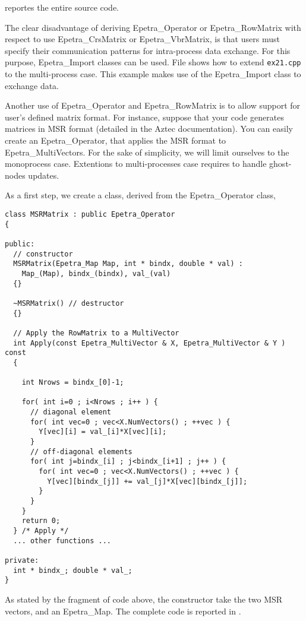  reportes the entire source code.

\begin{remark}
  The clear disadvantage of deriving Epetra\_Operator or
  Epetra\_RowMatrix with respect to use Epetra\_CrsMatrix or
  Epetra\_VbrMatrix, is that users must specify their communication
  patterns for intra-process data exchange. For this purpose,
  Epetra\_Import classes can be used.  File 
  shows how to extend \verb!ex21.cpp! to the multi-process case. This
  example makes use of the Epetra\_Import class to exchange data.
\end{remark}


Another use of  Epetra\_Operator and Epetra\_RowMatrix is to allow
support for user's defined matrix format. For instance, suppose that
your code generates matrices in MSR format (detailed in the Aztec
documentation). You can easily create an Epetra\_Operator, that applies
the MSR format to Epetra\_MultiVectors. For the sake of simplicity, we
will limit ourselves to the monoprocess case. Extentions to
multi-processes case requires to handle ghost-nodes updates.

As a first step, we create a class, derived from the Epetra\_Operator
class,
\begin{verbatim}
class MSRMatrix : public Epetra_Operator 
{

public:
  // constructor
  MSRMatrix(Epetra_Map Map, int * bindx, double * val) :
    Map_(Map), bindx_(bindx), val_(val) 
  {}

  ~MSRMatrix() // destructor
  {}

  // Apply the RowMatrix to a MultiVector
  int Apply(const Epetra_MultiVector & X, Epetra_MultiVector & Y ) const 
  {

    int Nrows = bindx_[0]-1;
    
    for( int i=0 ; i<Nrows ; i++ ) {
      // diagonal element
      for( int vec=0 ; vec<X.NumVectors() ; ++vec ) {
        Y[vec][i] = val_[i]*X[vec][i];
      }
      // off-diagonal elements
      for( int j=bindx_[i] ; j<bindx_[i+1] ; j++ ) {
        for( int vec=0 ; vec<X.NumVectors() ; ++vec ) {
          Y[vec][bindx_[j]] += val_[j]*X[vec][bindx_[j]];
        }
      }
    }
    return 0;
  } /* Apply */
  ... other functions ...

private:
  int * bindx_; double * val_;
}
\end{verbatim}
As stated by the fragment of code above, the constructor take the two
MSR vectors, and an Epetra\_Map. The complete code is reported in
.


